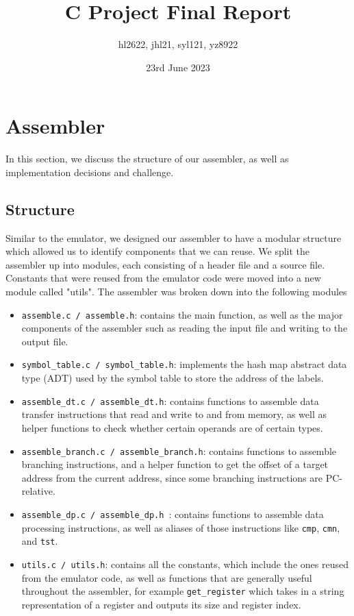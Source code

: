 \documentclass{article}
\title{C Project Final Report}
\author{hl2622, jhl21, syl121, yz8922}
\date{23rd June 2023}
\begin{document}
    \maketitle
    \section{Assembler}
        In this section, we discuss the structure of our assembler, as well as implementation decisions and challenge.
    
        \begin{adjustwidth}{2em}{0pt}
        
        \subsection{Structure}
        
            Similar to the emulator, we designed our assembler to have a modular structure which allowed us to identify components that we can reuse. We split the assembler up into modules, each consisting of a header file and a source file. Constants that were reused from the emulator code were moved into a new module called "utils". The assembler was broken down into the following modules
        
            \begin{itemize}
                \item \texttt{assemble.c / assemble.h}: contains the main function, as well as the major components of the assembler such as reading the input file and writing to the output file. 
                \item  \texttt{symbol\_table.c / symbol\_table.h}: implements the hash map abstract data type (ADT) used by the symbol table to store the address of the labels.
                \item \texttt{assemble\_dt.c / assemble\_dt.h}: contains functions to assemble data transfer instructions that read and write to and from memory, as well as helper functions to check whether certain operands are of certain types.
                \item \texttt{assemble\_branch.c / assemble\_branch.h}: contains functions to assemble branching instructions, and a helper function to get the offset of a target address from the current address, since some branching instructions are PC-relative. 
                \item \texttt{assemble\_dp.c / assemble\_dp.h }: contains functions to assemble data processing instructions, as well as aliases of those instructions like \texttt{cmp}, \texttt{cmn}, and \texttt{tst}.
                \item \texttt{utils.c / utils.h}: contains all the constants, which include the ones reused from the emulator code, as well as functions that are generally useful throughout the assembler, for example \texttt{get\_register} which takes in a string representation of a register and outputs its size and register index.
            \end{itemize}

\end{adjustwidth}
\end{document}
